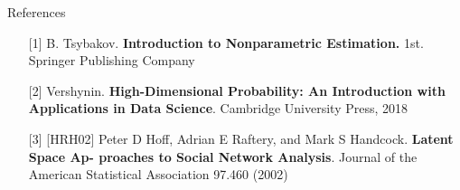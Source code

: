 \documentclass[final,dvipsnames]{beamer}
\begin{document}
\begin{frame}
\begin{columns}[T]
\begin{column}{0.49\textwidth}
\begin{block}{References}
    {\footnotesize
    \begin{itemize}
    \item[{[1]}] B. Tsybakov. \textbf{Introduction to Nonparametric Estimation.} 1st.
    Springer Publishing Company
    \item[{[2]}] Vershynin. \textbf{High-Dimensional Probability: An Introduction with Applications in Data Science}. Cambridge University Press, 2018
    \item[{[3]}] [HRH02] Peter D Hoff, Adrian E Raftery, and Mark S Handcock. \textbf{Latent Space Ap-
    proaches to Social Network Analysis}. Journal of the American Statistical
    Association 97.460 (2002)
    \end{itemize}
    }
\end{block}
\end{column}
\end{columns}
\end{frame}
\end{document}
